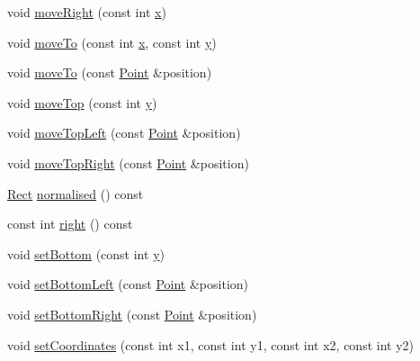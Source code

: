 \begin{DoxyCompactItemize}
\item 
void \hyperlink{classprism_1_1geometry_1_1_rect_ac19e6cdd500aa51993012cd0b49e8754}{move\+Right} (const int \hyperlink{classprism_1_1geometry_1_1_rect_a7ecf0e30c1485b8b6ed1c83625e0ce4c}{x})
\item 
void \hyperlink{classprism_1_1geometry_1_1_rect_a8b9e6ed6ee5275599efa469c827c0fbc}{move\+To} (const int \hyperlink{classprism_1_1geometry_1_1_rect_a7ecf0e30c1485b8b6ed1c83625e0ce4c}{x}, const int \hyperlink{classprism_1_1geometry_1_1_rect_aae87aa965538d7d9ba24050d111fbd0f}{y})
\item 
void \hyperlink{classprism_1_1geometry_1_1_rect_a9feb882f94b8e0610a393fcf255374b3}{move\+To} (const \hyperlink{classprism_1_1geometry_1_1_point}{Point} \&position)
\item 
void \hyperlink{classprism_1_1geometry_1_1_rect_aa19b2e99776eac3a751e678672124d19}{move\+Top} (const int \hyperlink{classprism_1_1geometry_1_1_rect_aae87aa965538d7d9ba24050d111fbd0f}{y})
\item 
void \hyperlink{classprism_1_1geometry_1_1_rect_a611fc63e8429a6eeb4677ee58e157972}{move\+Top\+Left} (const \hyperlink{classprism_1_1geometry_1_1_point}{Point} \&position)
\item 
void \hyperlink{classprism_1_1geometry_1_1_rect_a75ef65067f2f99ea0d91074cda481e16}{move\+Top\+Right} (const \hyperlink{classprism_1_1geometry_1_1_point}{Point} \&position)
\item 
\hyperlink{classprism_1_1geometry_1_1_rect}{Rect} \hyperlink{classprism_1_1geometry_1_1_rect_ab3e98aad0d5e86a221bf7582de29492a}{normalised} () const 
\item 
const int \hyperlink{classprism_1_1geometry_1_1_rect_a01f98f870b9dc5eff36c5c2e0ba477b4}{right} () const 
\item 
void \hyperlink{classprism_1_1geometry_1_1_rect_aa488d5deee04a94e9a3e2c4fa3ecda8b}{set\+Bottom} (const int \hyperlink{classprism_1_1geometry_1_1_rect_aae87aa965538d7d9ba24050d111fbd0f}{y})
\item 
void \hyperlink{classprism_1_1geometry_1_1_rect_aa35fb4766ed7e61c8a44ecacb60321ee}{set\+Bottom\+Left} (const \hyperlink{classprism_1_1geometry_1_1_point}{Point} \&position)
\item 
void \hyperlink{classprism_1_1geometry_1_1_rect_a07edad0ec9c4fac6fe6e9e5fd2f80b6c}{set\+Bottom\+Right} (const \hyperlink{classprism_1_1geometry_1_1_point}{Point} \&position)
\item 
void \hyperlink{classprism_1_1geometry_1_1_rect_a8525f68d4771bf68be7f105d36fdbac7}{set\+Coordinates} (const int x1, const int y1, const int x2, const int y2)

\end{DoxyCompactItemize}

